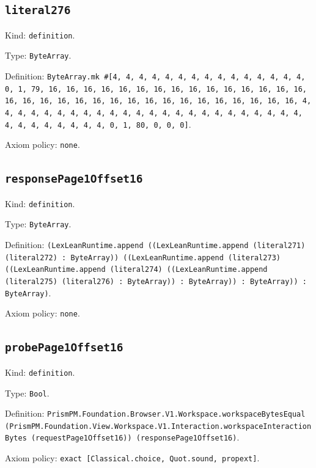\documentclass[11pt]{article}
\begin{document}
\subsection*{\texttt{literal276}}
\noindent Kind: \texttt{definition}.\par
\noindent Type: \texttt{ByteArray}.\par
\noindent Definition: \texttt{ByteArray.mk \#[4, 4, 4, 4, 4, 4, 4, 4, 4, 4, 4, 4, 4, 4, 4, 0, 1, 79, 16, 16, 16, 16, 16, 16, 16, 16, 16, 16, 16, 16, 16, 16, 16, 16, 16, 16, 16, 16, 16, 16, 16, 16, 16, 16, 16, 16, 16, 16, 16, 16, 4, 4, 4, 4, 4, 4, 4, 4, 4, 4, 4, 4, 4, 4, 4, 4, 4, 4, 4, 4, 4, 4, 4, 4, 4, 4, 4, 4, 4, 4, 4, 4, 0, 1, 80, 0, 0, 0]}.\par
\noindent Axiom policy: \texttt{none}.\par
\subsection*{\texttt{responsePage1Offset16}}
\noindent Kind: \texttt{definition}.\par
\noindent Type: \texttt{ByteArray}.\par
\noindent Definition: \texttt{(LexLeanRuntime.append ((LexLeanRuntime.append (literal271) (literal272) : ByteArray)) ((LexLeanRuntime.append (literal273) ((LexLeanRuntime.append (literal274) ((LexLeanRuntime.append (literal275) (literal276) : ByteArray)) : ByteArray)) : ByteArray)) : ByteArray)}.\par
\noindent Axiom policy: \texttt{none}.\par
\subsection*{\texttt{probePage1Offset16}}
\noindent Kind: \texttt{definition}.\par
\noindent Type: \texttt{Bool}.\par
\noindent Definition: \texttt{PrismPM.Foundation.Browser.V1.Workspace.workspaceBytesEqual (PrismPM.Foundation.View.Workspace.V1.Interaction.workspaceInteractionBytes (requestPage1Offset16)) (responsePage1Offset16)}.\par
\noindent Axiom policy: \texttt{exact [Classical.choice, Quot.sound, propext]}.\par
\end{document}

